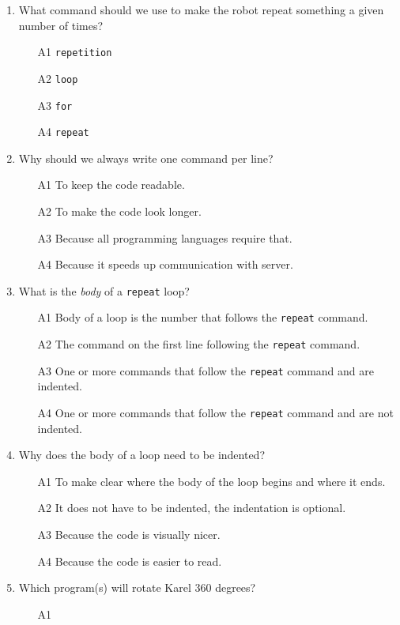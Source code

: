\documentclass[article,A4,12pt]{llncs}
\begin{document}
\begin{enumerate}
\item What command should we use to make the robot repeat something a given number of times?
\begin{enumerate}
\item[A1] {\tt repetition}
\item[A2] {\tt loop}
\item[A3] {\tt for}
\item[A4] {\tt repeat}
\end{enumerate}
\item Why should we always write one command per line?
\begin{enumerate}
\item[A1] To keep the code readable.
\item[A2] To make the code look longer.
\item[A3] Because all programming languages require that.
\item[A4] Because it speeds up communication with server.
\end{enumerate}
\item What is the {\em body} of a {\tt repeat} loop?
\begin{enumerate}
\item[A1] Body of a loop is the number that follows the {\tt repeat} command. 
\item[A2] The command on the first line following the {\tt repeat} command.
\item[A3] One or more commands that follow the {\tt repeat} command and are indented.
\item[A4] One or more commands that follow the {\tt repeat} command and are not indented.
\end{enumerate}
\item Why does the body of a loop need to be indented?
\begin{enumerate}
\item[A1] To make clear where the body of the loop begins and where it ends.
\item[A2] It does not have to be indented, the indentation is optional.
\item[A3] Because the code is visually nicer.
\item[A4] Because the code is easier to read.
\end{enumerate}
\item Which program(s) will rotate Karel 360 degrees?
\begin{enumerate}
\item[A1] 

\end{enumerate}
\end{enumerate}
\end{document}
